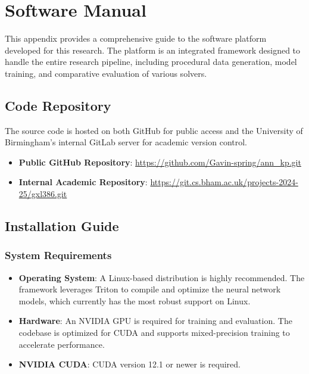 
\appendix
\chapter{Software Manual}
\label{chap:software_manual}

This appendix provides a comprehensive guide to the software platform developed for this research. The platform is an integrated framework designed to handle the entire research pipeline, including procedural data generation, model training, and comparative evaluation of various solvers.

\section{Code Repository}
The source code is hosted on both GitHub for public access and the University of Birmingham's internal GitLab server for academic version control.

\begin{itemize}
    \item \small\textbf{Public GitHub Repository}: \url{https://github.com/Gavin-spring/ann_kp.git}
    \item \small\textbf{Internal Academic Repository}: \url{https://git.cs.bham.ac.uk/projects-2024-25/gxl386.git}
\end{itemize}

\section{Installation Guide}

\subsection{System Requirements}
\begin{itemize}
    \item \textbf{Operating System}: A Linux-based distribution is highly recommended. The framework leverages Triton to compile and optimize the neural network models, which currently has the most robust support on Linux.
    \item \textbf{Hardware}: An NVIDIA GPU is required for training and evaluation. The codebase is optimized for CUDA and supports mixed-precision training to accelerate performance.
    \item \textbf{NVIDIA CUDA}: CUDA version 12.1 or newer is required.
\end{itemize}

